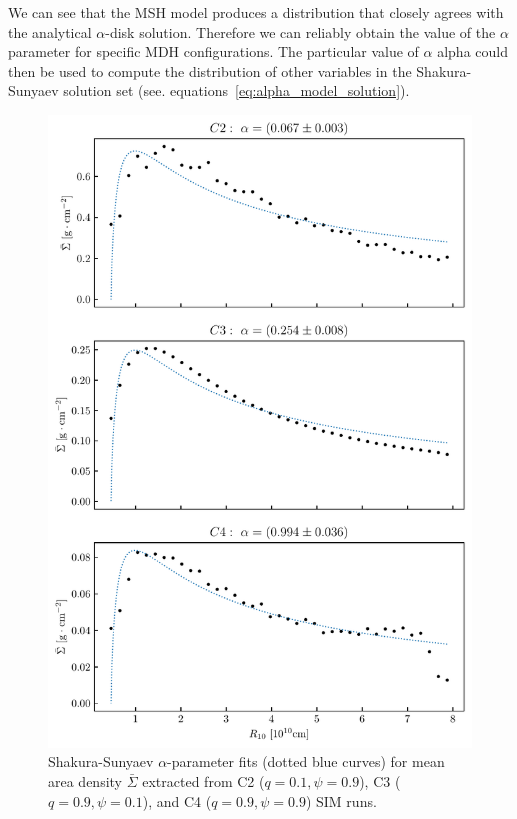     We can see that the MSH model produces a distribution that closely agrees with the analytical $\alpha$-disk solution. Therefore we can reliably obtain the value of the $\alpha$ parameter for specific MDH configurations. The particular value of $\alpha$ alpha could then be used to compute the distribution of other variables in the Shakura-Sunyaev solution set (see. equations~\eqref{eq:alpha_model_solution}).  
    
    \begin{figure}[H]
    \begin{center}
    \includegraphics{img/plot_mean_density_fit.pdf}
    \end{center}
        \caption{Shakura-Sunyaev $\alpha$-parameter fits (dotted blue curves) for mean area density $\bar{\Sigma}$ extracted from C2 ($q=0.1, \psi=0.9$), C3 ($q=0.9, \psi=0.1$), and C4 ($q=0.9, \psi=0.9$) SIM runs. }
    \label{fig:plot_mean_density_fit}
    \end{figure}
